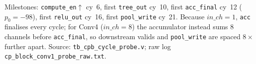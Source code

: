 \begin{table}[t]
\smallskip
{\footnotesize Milestones: \texttt{compute\_en}$\uparrow$ cy~6, first \texttt{tree\_out}
cy~10, first \texttt{acc\_final} cy~12 ($p_0=-98$), first \texttt{relu\_out} cy~16,
first \texttt{pool\_write} cy~21. Because $\mathit{in\_ch}=1$, \texttt{acc} finalises
every cycle; for Conv4 ($\mathit{in\_ch}=8$) the accumulator instead sums 8 channels
before \texttt{acc\_final}, so downstream valids and \texttt{pool\_write} are spaced
$8\times$ further apart. Source: \texttt{tb\_cpb\_cycle\_probe.v};
raw log \texttt{cp\_block\_conv1\_probe\_raw.txt}.}
\end{table}


